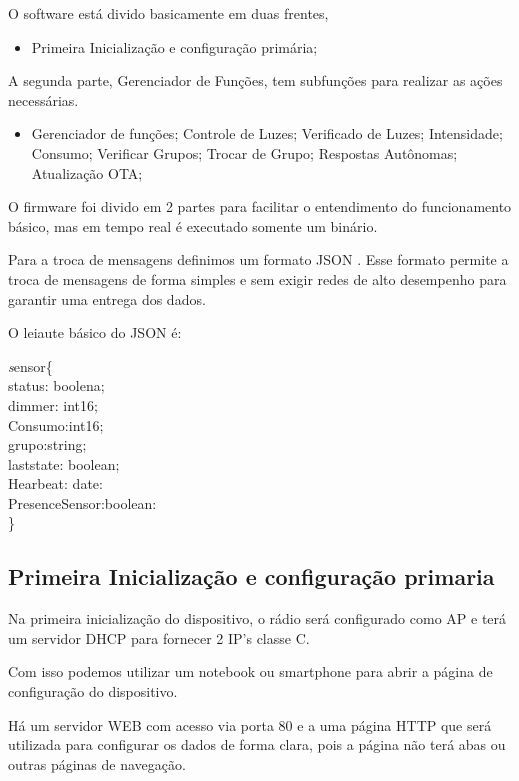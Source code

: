 \documentclass[openright]{normas-utf-tex} %
\begin{document}
O software está divido basicamente em duas frentes,

\begin{itemize}
    \item Primeira Inicialização e configuração primária;
\end{itemize}
A segunda parte, Gerenciador de Funções, tem subfunções para realizar as ações necessárias.
\begin{itemize}
    \item Gerenciador de funções;
    \subitem Controle de Luzes;
    \subitem Verificado de Luzes;
    \subitem Intensidade;
    \subitem Consumo;
    \subitem Verificar Grupos;
    \subitem Trocar de Grupo;
    \subitem Respostas Autônomas;
    \subitem Atualização OTA;
\end{itemize}

O firmware foi divido em 2 partes para facilitar o entendimento do funcionamento básico, mas em tempo real é executado somente um binário.

Para a troca de mensagens definimos um formato JSON \cite{json-devmedia}. Esse formato permite a troca de mensagens de forma simples e sem exigir redes de alto desempenho para garantir uma entrega dos dados.

O leiaute básico do JSON é:

\begin{center}
\textit
sensor\{\\ 
status: boolena; \\
dimmer: int16;\\
Consumo:int16; \\
grupo:string;\\
laststate: boolean;\\
Hearbeat: date: \\
PresenceSensor:boolean:\\
\}
\end{center}
\subsection{Primeira Inicialização e configuração primaria}


Na primeira inicialização do dispositivo, o rádio será configurado como AP e terá um servidor DHCP para fornecer 2 IP's classe C.

Com isso podemos utilizar um notebook ou smartphone para abrir a página de configuração do dispositivo.

Há  um servidor WEB com acesso via porta 80 e a uma página HTTP que será utilizada para configurar os dados de forma clara, pois a página não terá abas ou outras páginas de navegação.
\end{document}
